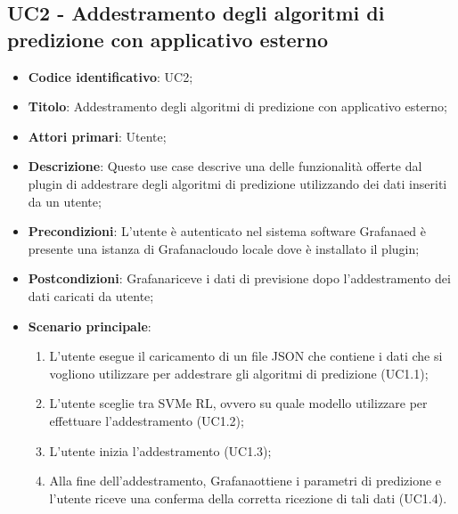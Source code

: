 \subsection{UC2 - Addestramento degli algoritmi di predizione con applicativo esterno}
\begin{itemize}
    \item \textbf{Codice identificativo}: UC2;
    \item \textbf{Titolo}: Addestramento degli algoritmi di predizione con applicativo esterno;
    \item \textbf{Attori primari}: Utente;
    \item \textbf{Descrizione}: Questo use case descrive una delle funzionalità offerte dal plugin di addestrare degli algoritmi di predizione utilizzando dei dati inseriti da un utente;
    \item \textbf{Precondizioni}: L'utente è autenticato nel sistema software Grafana\glosp ed è presente una istanza di Grafana\glosp cloud\glosp o locale dove è installato il plugin;
    \item \textbf{Postcondizioni}: Grafana\glosp riceve i dati di previsione dopo l'addestramento dei dati caricati da utente;
    \item \textbf{Scenario principale}: 
        \begin{enumerate}
            \item L'utente esegue il caricamento di un file JSON che contiene i dati che si vogliono utilizzare per addestrare gli algoritmi di predizione (UC1.1);
            \item L'utente sceglie tra SVM\glosp e RL\glo, ovvero su quale modello utilizzare per effettuare l'addestramento (UC1.2);
            \item L'utente inizia l'addestramento (UC1.3);
            \item Alla fine dell'addestramento, Grafana\glosp ottiene i parametri di predizione e l'utente riceve una conferma della corretta ricezione di tali dati (UC1.4).
        \end{enumerate}
\end{itemize}

